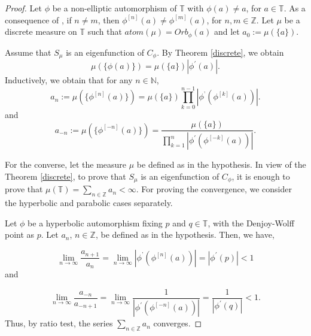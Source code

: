 \documentclass[12pt, reqno]{amsart}
\theoremstyle{definition}
\numberwithin{equation}{section}
\begin{document}
\begin{proof}
	Let $\phi$ be a non-elliptic automorphism of $\mathbb{T}$ with $\phi(a)\neq a$, for  $a\in \mathbb{T}$. As a consequence of \cite[Lemma 5.4.4, 5.4.8]{texthardy}, if $n \neq m $, then $\phi^{[n]}(a)\neq \phi^{[m]}(a)$, for $n,m \in \mathbb{Z}$. Let $\mu$ be a discrete measure on $\mathbb{T}$ such that $atom(\mu)=Orb_{\phi}(a)$ and let $a_0:=\mu(\{a\})$. 
	
	Assume that $S_\mu$ is an eigenfunction of $C_\phi$. 
By Theorem \ref{discrete}, we obtain
	$$\mu(\{\phi(a)\})=\mu(\{a\}) |\phi^{'}(a)|.$$
	Inductively, we obtain that for any $n \in \mathbb{N}$,
	\begin{equation*}\label{an}
		a_n:=\mu(\{\phi^{[n]}(a)\})=\mu(\{a\}) \prod\limits_{k=0}^{n-1}|\phi^{’}(\phi^{[k]}(a))|.
	\end{equation*}
and
	\begin{equation*}\label{a-n}
		a_{-n}:=\mu(\{\phi^{[-n]}(a)\})=\dfrac{\mu(\{a\})} {\prod\limits_{k=1}^{n}|\phi^{'}(\phi^{[-k]}(a))|}.
	\end{equation*}
	
	
	For the converse, let the measure $\mu$ be defined as in the hypothesis.  In view of the Theorem \ref{discrete}, to prove that $S_\mu$ is an eigenfunction of $C_\phi$, it is enough to prove that $\mu(\mathbb{T})=\sum_{n \in \mathbb{Z}}a_n<\infty.$ 
	For proving the convergence, we consider the hyperbolic and parabolic cases separately.
	
	Let $\phi$ be a hyperbolic automorphism fixing $p$ and $q \in \mathbb{T}$, with the Denjoy-Wolff point as $p$.
	Let $a_n$, $n \in \mathbb{Z}$, be defined as in the hypothesis. Then, we have,

 $$\lim\limits_{n \rightarrow \infty}\frac{a_{n+1}}{a_n}=\lim\limits_{n \rightarrow \infty}|\phi^{’}(\phi^{[n]}(a))|=|\phi^{'}(p)|<1$$ and

  $$\lim\limits_{n \rightarrow \infty}\frac{a_{-n}}{a_{-n+1}}=\lim\limits_{n \rightarrow \infty}\dfrac{1}{|\phi^{'}(\phi^{[-n]}(a))|}=\dfrac{1}{|\phi^{'}(q)|}<1.$$ Thus, by ratio test, the series $\sum_{n \in \mathbb{Z}}a_n$ converges.
	

\end{proof}
\end{document}
